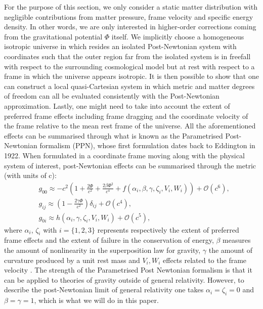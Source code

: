\documentclass[aps,pra,amsmath,amssymb,amsthm,floatfix,nofootinbib,notitlepage,superscriptaddress,10pt]{revtex4-2}
\begin{document}
For the purpose of this section, we only consider a static matter distribution with negligible contributions from matter pressure, frame velocity and specific energy density. In other words, we are only interested in higher-order corrections coming from the gravitational potential $\Phi$ itself. We implicitly choose a homogeneous isotropic universe in which resides an isolated Post-Newtonian system with coordinates such that the outer region far from the isolated system is in freefall with respect to the surrounding cosmological model but at rest with respect to a frame in which the universe appears isotropic. It is then possible to show that one can construct a local quasi-Cartesian system in which metric and matter degrees of freedom can all be evaluated consistently with the Post-Newtonian approximation. Lastly, one might need to take into account the extent of preferred frame effects including frame dragging and the coordinate velocity of the frame relative to the mean rest frame of the universe. All the aforementioned effects can be summarised through what is known as the Parametrised Post-Newtonian formalism (PPN), whose first formulation dates back to Eddington in 1922. When formulated in a coordinate frame moving along with the physical system of interest, post-Newtonian effects can be summarised through the metric (with units of c):
\begin{equation}
	\label{eq: PPN_metric}
	\begin{split}
		&g_{00}\approx-c^2\left(1+\frac{2\Phi}{c^2}+\frac{2\beta\Phi^2}{c^4}+f(\alpha_i,\beta,\gamma,\zeta_i,V_i,W_i)\right)+\mathcal{O}(c^6), \\
		&g_{ij}\approx\left(1-\frac{2\gamma\Phi}{c^2}\right)\delta_{ij}+\mathcal{O}(c^4),\\
		&g_{0i}\approx h(\alpha_i,\gamma,\zeta_i,V_i,W_i)+\mathcal{O}(c^{5}),
	\end{split}        
\end{equation}
where $\alpha_i$, $\zeta_i$ with $i=\{1,2,3\}$ represents respectively the extent of preferred frame effects and the extent of failure in the conservation of energy, $\beta$ measures the amount of nonlinearity in the superposition law for gravity, $\gamma$ the amount of curvature produced by a unit rest mass and $V_i,W_i$ effects related to the frame velocity \cite{PPN,Will:2011nz}. The strength of the Parametrised Post Newtonian formalism is that it can be applied to theories of gravity outside of general relativity. However, to describe the post-Newtonian limit of general relativity one takes $\alpha_i=\zeta_i=0$ and $\beta=\gamma=1$, which is what we will do in this paper.
\end{document}
